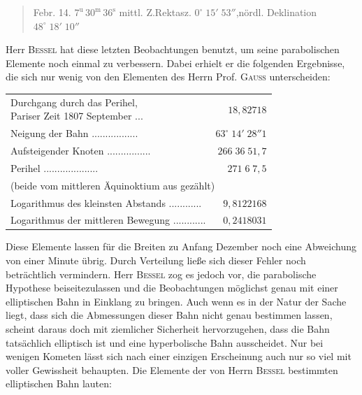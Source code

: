 \begin{quote}
Febr. 14. $7^{\text{u}}\,30^{\text{m}}\,36^{\text{s}}$ mittl. Z.\quad Rektasz. $0^\circ\;15'\;53''$,\quad nördl. Deklination $48^\circ\;18'\;10''$
\end{quote}

\par\indent Herr \textsc{Bessel} hat diese letzten Beobachtungen benutzt, um seine parabolischen Elemente noch einmal zu verbessern. Dabei erhielt er die folgenden Ergebnisse, die sich nur wenig von den Elementen des Herrn Prof. \textsc{Gauss} unterscheiden:


\begin{center}\fontsize{9}{11}\selectfont\setlength{\tabcolsep}{3pt}\renewcommand{\arraystretch}{1.15}\begin{tabular}{lr}
\shortstack[l]{Durchgang durch das Perihel,\\Pariser Zeit 1807 September} .\;.\;.\; & $18{,}82718$\\
Neigung der Bahn .\;.\;.\;.\;.\;.\;.\;.\;.\;.\;.\;.\;.\;.\;.\;.\;.\; & $63^\circ\;14'\;28''1$\\
Aufsteigender Knoten .\;.\;.\;.\;.\;.\;.\;.\;.\;.\;.\;.\;.\;.\;.\;.\; & $266\;36\;51{,}7$\\
Perihel .\;.\;.\;.\;.\;.\;.\;.\;.\;.\;.\;.\;.\;.\;.\;.\;.\;.\;.\;.\; & $271\;6\;7{,}5$\\
\multicolumn{2}{l}{(beide vom mittleren Äquinoktium aus gezählt)}\\
Logarithmus des kleinsten Abstands .\;.\;.\;.\;.\;.\;.\;.\;.\;.\;.\;.\; & $9{,}8122168$\\
Logarithmus der mittleren Bewegung .\;.\;.\;.\;.\;.\;.\;.\;.\;.\;.\;.\; & $0{,}2418031$\\
\end{tabular}\end{center}


\par\indent Diese Elemente lassen für die Breiten zu Anfang Dezember noch eine Abweichung von einer Minute übrig. Durch Verteilung ließe sich dieser Fehler noch beträchtlich vermindern. Herr \textsc{Bessel} zog es jedoch vor, die parabolische Hypothese beiseitezulassen und die Beobachtungen möglichst genau mit einer elliptischen Bahn in Einklang zu bringen. Auch wenn es in der Natur der Sache liegt, dass sich die Abmessungen dieser Bahn nicht genau bestimmen lassen, scheint daraus doch mit ziemlicher Sicherheit hervorzugehen, dass die Bahn tatsächlich elliptisch ist und eine hyperbolische Bahn ausscheidet. Nur bei wenigen Kometen lässt sich nach einer einzigen Erscheinung auch nur so viel mit voller Gewissheit behaupten. Die Elemente der von Herrn \textsc{Bessel} bestimmten elliptischen Bahn lauten:


